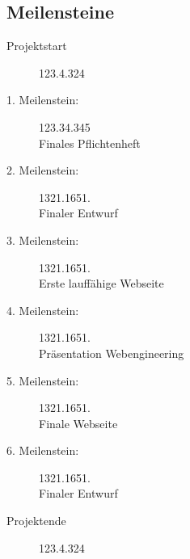 \newpage
\subsection{Meilensteine}
\begin{description}
	\item[Projektstart] 123.4.324
	\item[1. Meilenstein:] 123.34.345\\
	Finales Pflichtenheft
	\item[2. Meilenstein:] 1321.1651.\\
	Finaler Entwurf
	\item[3. Meilenstein:] 1321.1651.\\
	Erste lauffähige Webseite
	\item[4. Meilenstein:] 1321.1651.\\
	Präsentation Webengineering
	\item[5. Meilenstein:] 1321.1651.\\
	Finale Webseite
	\item[6. Meilenstein:] 1321.1651.\\
	Finaler Entwurf
	\item[Projektende] 123.4.324
\end{description}